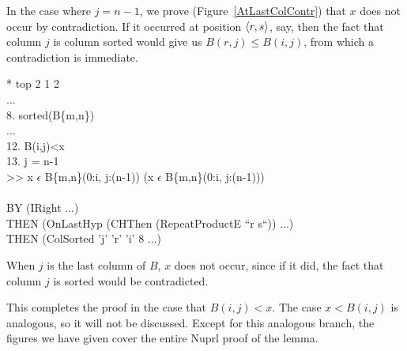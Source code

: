 In the case where $j=n-1$, we prove (Figure~\ref{AtLastColContr})
that $x$ does not occur by contradiction.
If it occurred at position $\langle r,s \rangle$, say, then the fact that column $j$ is
column sorted would give us $B(r,j) \leq B(i,j)$, from which a
contradiction is immediate.
\begin{RuledFigure}
\begin{Screen}{1}{\SnapshotSize}
\N{}* top 2 1 2 \\{}
\N{}... \\{}
\N{}8. sorted(B\{m,n\}) \\{}
\N{}... \\{}
\N{}12. B(i,j)<x \\{}
\N{}13. j = n-1 \\{}
\N{}>> x \(\epsilon{}\) B\{m,n\}(0:i, j:(n-1))  \mvee{}  \mneg{}(x \(\epsilon{}\) B\{m,n\}(0:i, j:(n-1))) \\{}
\N{} \\{}
\N{}BY (IRight ...)  \\{}
\N{}   THEN (OnLastHyp (CHThen (RepeatProductE ``r s``)) ...) \\{}
\N{}   THEN (ColSorted 'j' 'r' 'i' 8 ...) 
\end{Screen}%
\caption{When $j$ is the last column of $B$, $x$ does not occur,
since if it did, 
the fact that column $j$ is sorted would be contradicted.}
\label{AtLastColContr} 
\end{RuledFigure}

This completes the proof in the case that $B(i,j)<x$.  The case $x<B(i,j)$ is
analogous, so it will not be discussed.  Except for this analogous branch, the
figures we have given cover the entire Nuprl proof of the lemma.  

